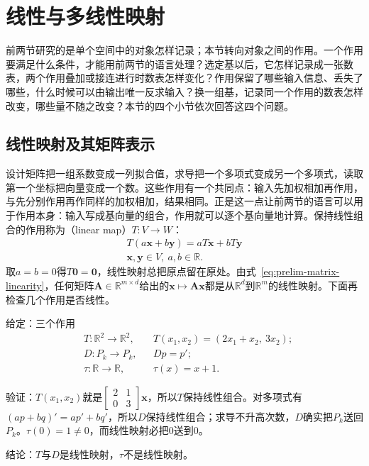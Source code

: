 
\section{线性与多线性映射}
\label{sec:ls-linear-maps}
\label{sec:linear-algebra-matrices-linear-maps}

前两节研究的是单个空间中的对象怎样记录；本节转向对象之间的作用。一个作用要满足什么条件，才能用前两节的语言处理？选定基以后，它怎样记录成一张数表，两个作用叠加或接连进行时数表怎样变化？作用保留了哪些输入信息、丢失了哪些，什么时候可以由输出唯一反求输入？换一组基，记录同一个作用的数表怎样改变，哪些量不随之改变？本节的四个小节依次回答这四个问题。

\subsection{线性映射及其矩阵表示}
\label{sec:ls-linear-map-definition}
\label{sec:linear-algebra-maps}

设计矩阵把一组系数变成一列拟合值，求导把一个多项式变成另一个多项式，读取第一个坐标把向量变成一个数。这些作用有一个共同点：输入先加权相加再作用，与先分别作用再作同样的加权相加，结果相同。正是这一点让前两节的语言可以用于作用本身：输入写成基向量的组合，作用就可以逐个基向量地计算。保持线性组合的作用称为（linear map）$T:V\to W$：
\begin{equation}
\begin{gathered}
T(a\bm x+b\bm y)=aT\bm x+bT\bm y\\
\bm x,\bm y\in V,\ a,b\in\mathbb R.
\end{gathered}
\label{eq:ls-linear-map-def}
\end{equation}
取$a=b=0$得$T\bm0=\bm0$，线性映射总把原点留在原处。由式~\eqref{eq:prelim-matrix-linearity}，任何矩阵$\bm A\in\mathbb R^{m\times d}$给出的$\bm x\mapsto\bm A\bm x$都是从$\mathbb R^d$到$\mathbb R^m$的线性映射。下面再检查几个作用是否线性。
\begin{example}[线性与非线性的作用]
\label{ex:ls-linear-map-checks}
给定：三个作用
\[
 \begin{aligned}
 &T:\mathbb R^2\to\mathbb R^2, &&T(x_1,x_2)=(2x_1+x_2,\ 3x_2);\\
 &D:P_k\to P_k, &&Dp=p';\\
 &\tau:\mathbb R\to\mathbb R, &&\tau(x)=x+1.
 \end{aligned}
\]

验证：$T(x_1,x_2)$就是$\left[\begin{smallmatrix}2&1\\0&3\end{smallmatrix}\right]\bm x$，所以$T$保持线性组合。对多项式有$(ap+bq)'=ap'+bq'$，所以$D$保持线性组合；求导不升高次数，$D$确实把$P_k$送回$P_k$。$\tau(0)=1\neq0$，而线性映射必把$0$送到$0$。

结论：$T$与$D$是线性映射，$\tau$不是线性映射。
\end{example}

